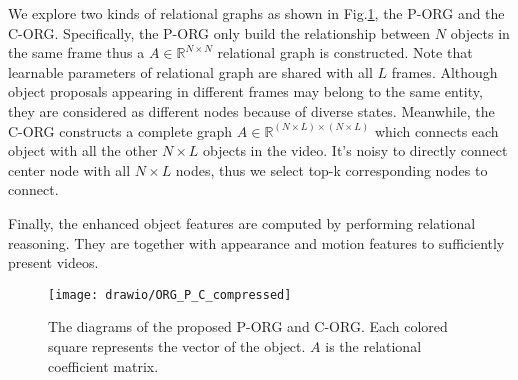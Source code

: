 \documentclass[10pt,twocolumn,letterpaper]{article}
\begin{document}
We explore two kinds of relational graphs as shown in Fig.\ref{fig:org}, the P-ORG and the C-ORG. Specifically, the P-ORG only build the relationship between $N$ objects in the same frame thus a $A \in \mathbb{R}^{N \times N}$ relational graph is constructed. Note that learnable parameters of relational graph are shared with all $L$ frames. Although object proposals appearing in different frames may belong to the same entity, they are considered as different nodes because of diverse states. Meanwhile, the C-ORG constructs a complete graph $A \in \mathbb{R}^{(N\times L)\times (N\times L)}$ which connects each object with all the other $N \times L$ objects in the video. It's noisy to directly connect center node with all $N \times L$ nodes, thus we select top-k corresponding nodes to connect.

Finally, the enhanced object features are computed by performing relational reasoning. They are together with appearance and motion features to sufficiently present videos.


\begin{figure}
	\begin{center}
	\texttt{[image: drawio/ORG\_P\_C\_compressed]}
	\end{center}
	\caption{The diagrams of the proposed P-ORG and C-ORG. Each colored square represents the vector of the object. $A$ is the relational coefficient matrix. }
	\label{fig:org}
	\vspace{-0.5cm}
\end{figure}
\end{document}

